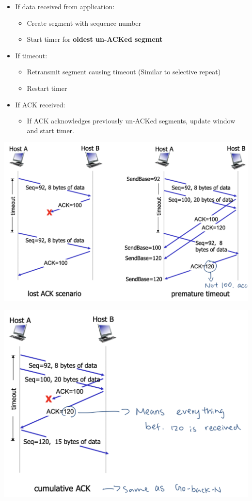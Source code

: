 \documentclass{article}
\begin{document}
\begin{multicols*}{3}
\begin{itemize}
    \item If data received from application:
    \begin{itemize}
        \item Create segment with sequence number
        \item Start timer for \textbf{oldest un-ACKed segment}
    \end{itemize}
    \item If timeout:
    \begin{itemize}
        \item Retransmit segment causing timeout (Similar to selective repeat)
        \item Restart timer
    \end{itemize}
    \item If ACK received:
    \begin{itemize}
        \item If ACK acknowledges previously un-ACKed segments, update window and start timer. 
    \end{itemize}
\end{itemize}

\includegraphics[scale=0.2]{tcp-retransmission-1}

\includegraphics[scale=0.2]{tcp-retransmission-2}


\end{multicols*}
\end{document}
